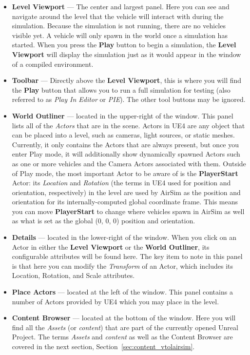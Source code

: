\begin{itemize}
    \item \textbf{Level Viewport} --- The center and largest panel. Here you can see and navigate around the level that the vehicle will interact with during the simulation. Because the simulation is not running, there are no vehicles visible yet. A vehicle will only spawn in the world once a simulation has started. When you press the \textbf{Play} button to begin a simulation, the \textbf{Level Viewport} will display the simulation just as it would appear in the window of a compiled environment.
    \item \textbf{Toolbar} --- Directly above the \textbf{Level Viewport}, this is where you will find the \textbf{Play} button that allows you to run a full simulation for testing (also referred to as \textit{Play In Editor} or \textit{PIE}). The other tool buttons may be ignored.
    \item \textbf{World Outliner} --- located in the upper-right of the window. This panel lists all of the \textit{Actors} that are in the scene. Actors in UE4 are any object that can be placed into a level, such as cameras, light sources, or static meshes. Currently, it only contains the Actors that are always present, but once you enter Play mode, it will additionally show dynamically spawned Actors such as one or more vehicles and the Camera Actors associated with them. Outside of Play mode, the most important Actor to be aware of is the \textbf{PlayerStart} Actor: its \textit{Location} and \textit{Rotation} (the terms in UE4 used for position and orientation, respectively) in the level are used by AirSim as the position and orientation for its internally-computed global coordinate frame. This means you can move \textbf{PlayerStart} to change where vehicles spawn in AirSim as well as what is set as the global (0, 0, 0) position and orientation.
    \item \textbf{Details} --- located in the lower-right of the window. When you click on an Actor in either the \textbf{Level Viewport} or the \textbf{World Outliner}, its configurable attributes will be found here. The key item to note in this panel is that here you can modify the \textit{Transform} of an Actor, which includes its Location, Rotation, and Scale attributes.
    \item \textbf{Place Actors} --- located at the left of the window. This panel contains a number of Actors provided by UE4 which you may place in the level.
    \item \textbf{Content Browser} --- located at the bottom of the window. Here you will find all the \textit{Assets} (or \textit{content}) that are part of the currently opened Unreal Project. The terms \textit{Assets} and \textit{content} as well as the Content Browser are covered in the next section, Section~\ref{sec:content_vtolairsim}.
\end{itemize}


